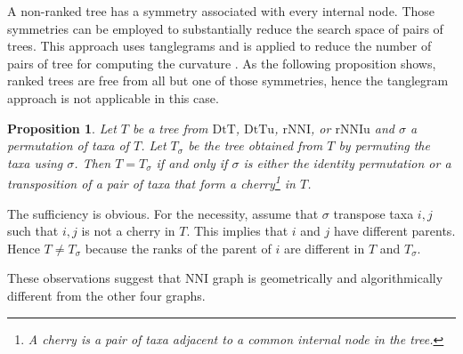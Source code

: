 \documentclass{amsart}
\newtheorem{proposition}[lemma]{Proposition}
\theoremstyle{definition}
\newcommand{\nni}{\mathrm{NNI}}
\newcommand{\rnni}{\mathrm{rNNI}}
\newcommand{\rnniu}{\mathrm{rNNIu}}
\newcommand{\dtt}{\mathrm{DtT}}
\newcommand{\dttu}{\mathrm{DtTu}}
\begin{document}
A non-ranked tree has a symmetry associated with every internal node.
Those symmetries can be employed to substantially reduce the search space of pairs of trees.
This approach uses tanglegrams \autocite{Matsen2015-fn} and is applied to reduce the number of pairs of tree for computing the curvature \autocite{Whidden2015-es}.
As the following proposition shows, ranked trees are free from all but one of those symmetries, hence the tanglegram approach is not applicable in this case.

\begin{proposition}
Let $T$ be a tree from $\dtt$, $\dttu$, $\rnni$, or $\rnniu$ and $\sigma$ a permutation of taxa of $T$.
Let $T_\sigma$ be the tree obtained from $T$ by permuting the taxa using $\sigma$.
Then $T = T_\sigma$ if and only if $\sigma$ is either the identity permutation or a transposition of a pair of taxa that form a
cherry\footnote{A \emph{cherry} is a pair of taxa adjacent to a common internal node in the tree.}
in $T$.
\end{proposition}

\proof
The sufficiency is obvious.
For the necessity, assume that $\sigma$ transpose taxa $i,j$ such that $i,j$ is not a cherry in $T$.
This implies that $i$ and $j$ have different parents.
Hence $T \ne T_\sigma$ because the ranks of the parent of $i$ are different in $T$ and $T_\sigma$.
\endproof

These observations suggest that $\nni$ graph is geometrically and algorithmically different from the other four graphs.
\end{document}

